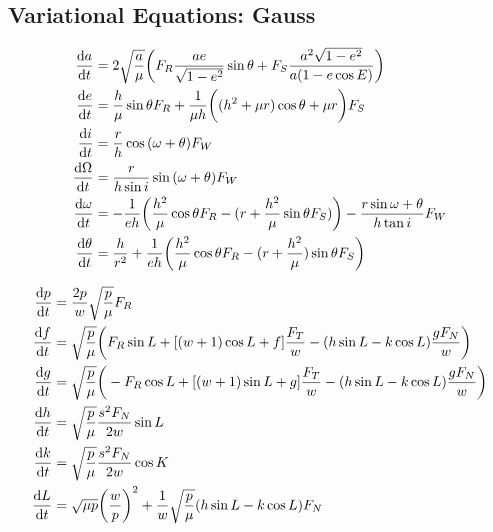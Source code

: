 \subsection{Variational Equations: Gauss}

\begin{equation}
    \begin{aligned}
        \dv{a}{t}&=2\sqrt{\frac{a}{\mu}}\bigg(F_R\frac{ae}{\sqrt{1-e^2}}\sin{\theta}+F_S\frac{a^2\sqrt{1-e^2}}{a(1-e\cos{E})}\bigg)\\
        \dv{e}{t}&=\frac{h}{\mu}\sin{\theta}F_R+\frac{1}{\mu{h}}\bigg((h^2+\mu{r})\cos{\theta}+\mu{r}\bigg)F_S\\
        \dv{i}{t}&=\frac{r}{h}\cos{(\omega+\theta)}F_W\\
        \dv{\Omega}{t}&=\frac{r}{h\sin{i}}\sin{(\omega+\theta)}F_W\\
        \dv{\omega}{t}&=-\frac{1}{eh}\bigg(\frac{h^2}{\mu}\cos{\theta}F_R-(r+\frac{h^2}{\mu}\sin{\theta}F_S)\bigg)-\frac{r\sin{\omega+\theta}}{h\tan{i}}F_W\\
        \dv{\theta}{t}&=\frac{h}{r^2}+\frac{1}{eh}\bigg(\frac{h^2}{\mu}\cos{\theta}F_R-(r+\frac{h^2}{\mu})\sin{\theta}F_S\bigg)
    \end{aligned}
\end{equation}

\begin{equation}
    \begin{aligned}
        \dv{p}{t}&=\frac{2p}{w}\sqrt{\frac{p}{\mu}}F_R\\
        \dv{f}{t}&=\sqrt{\frac{p}{\mu}}\bigg(F_R\sin{L}+[(w+1)\cos{L}+f]\frac{F_T}{w}-(h\sin{L}-k\cos{L})\frac{gF_N}{w}\bigg)\\
        \dv{g}{t}&=\sqrt{\frac{p}{\mu}}\bigg(-F_R\cos{L}+[(w+1)\sin{L}+g]\frac{F_T}{w}-(h\sin{L}-k\cos{L})\frac{gF_N}{w}\bigg)\\
        \dv{h}{t}&=\sqrt{\frac{p}{\mu}}\frac{s^2F_N}{2w}\sin{L}\\
        \dv{k}{t}&=\sqrt{\frac{p}{\mu}}\frac{s^2F_N}{2w}\cos{K}\\
        \dv{L}{t}&=\sqrt{\mu{p}}\bigg(\frac{w}{p}\bigg)^2+\frac{1}{w}\sqrt{\frac{p}{\mu}}(h\sin{L}-k\cos{L})F_N\\
    \end{aligned}
\end{equation}


